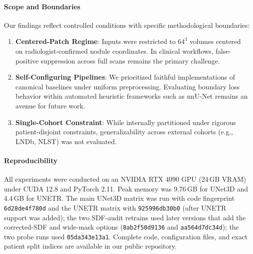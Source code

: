 \documentclass[10pt, a4paper, twocolumn]{article}
\begin{document}
\paragraph{Scope and Boundaries} Our findings reflect controlled conditions with specific methodological boundaries:
\begin{enumerate}
    \item \textbf{Centered-Patch Regime}: Inputs were restricted to $64^3$ volumes centered on radiologist-confirmed nodule coordinates. In clinical workflows, false-positive suppression across full scans remains the primary challenge.
    \item \textbf{Self-Configuring Pipelines}: We prioritized faithful implementations of canonical baselines under uniform preprocessing. Evaluating boundary loss behavior within automated heuristic frameworks such as nnU-Net \cite{isensee2021nnu} remains an avenue for future work.
    \item \textbf{Single-Cohort Constraint}: While internally partitioned under rigorous patient-disjoint constraints, generalizability across external cohorts (e.g., LNDb, NLST) was not evaluated.
\end{enumerate}

\paragraph{Reproducibility} All experiments were conducted on an NVIDIA RTX 4090 GPU (24\,GB VRAM) under CUDA 12.8 and PyTorch 2.11. Peak memory was 9.76\,GB for UNet3D and 4.4\,GB for UNETR. The main UNet3D matrix was run with code fingerprint \texttt{6d28de4f780d} and the UNETR matrix with \texttt{925996db30b0} (after UNETR support was added); the two SDF-audit retrains used later versions that add the corrected-SDF and wide-mask options (\texttt{8ab2f50d9136} and \texttt{aa564d7dc34d}); the two probe runs used \texttt{05da343e13a1}. Complete code, configuration files, and exact patient split indices are available in our public repository.
\end{document}
